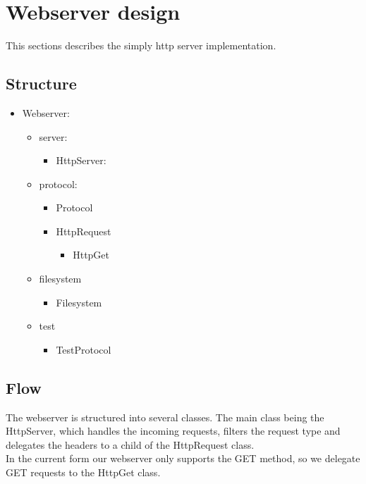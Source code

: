\documentclass{acm_proc_article-sp}
\begin{document}

\section{Webserver design}
This sections describes the simply http server implementation.

\subsection{Structure}
\begin{itemize}
    \item Webserver:
        \begin{itemize}
        \item server:
        \begin{itemize}        
            \item HttpServer:
        \end{itemize}
        \item protocol:
        \begin{itemize}
            \item Protocol    
            \item HttpRequest
            \begin{itemize}
                \item HttpGet
            \end{itemize}
        \end{itemize}
        \item filesystem
        \begin{itemize}
            \item Filesystem
        \end{itemize}
        \item test
        \begin{itemize}
            \item TestProtocol
        \end{itemize}
    \end{itemize}
\end{itemize}

\subsection{Flow}
The webserver is structured into several classes. The main class being the HttpServer, which handles the incoming requests, filters the request type and delegates the headers to a child of the HttpRequest class.\\
In the current form our webserver only supports the GET method, so we delegate GET requests to the HttpGet class.\\
\end{document}
